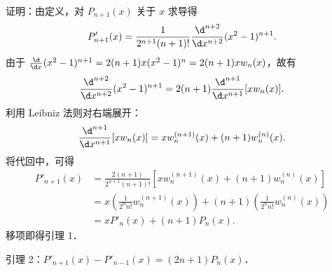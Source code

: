 \begin{myproof}
    证明：由定义，对 $P_{n+1}(x)$ 关于 $x$ 求导得
    \begin{equation}\label{eq:lemma1-step1}
        P'_{n+1}(x) = \frac{1}{2^{n+1}(n+1)!} \frac{\d^{n+2}}{\d x^{n+2}} (x^2 - 1)^{n+1}.
    \end{equation}
    由于 $\frac{\d}{\d x} (x^2 - 1)^{n+1} = 2(n+1)x (x^2 - 1)^n = 2(n+1) x w_n(x)$，故有
    \begin{equation}\label{eq:lemma1-step2}
        \frac{\d^{n+2}}{\d x^{n+2}} (x^2 - 1)^{n+1} = 2(n+1) \frac{\d^{n+1}}{\d x^{n+1}} [ x w_n(x) ].
    \end{equation}
    利用 Leibniz 法则对右端展开：
    \begin{equation}\label{eq:lemma1-step3}
        \frac{\d^{n+1}}{\d x^{n+1}} [ x w_n(x) ] = x w_n^{(n+1)}(x) + (n+1) w_n^{(n)}(x).
    \end{equation}
    将代回中，可得
    \begin{equation}\label{eq:lemma1-step4}
        \begin{aligned}
            P'_{n+1}(x) & = \frac{2(n+1)}{2^{n+1}(n+1)!} \left[ x w_n^{(n+1)}(x) + (n+1) w_n^{(n)}(x) \right]                     \\
                        & = x \left( \frac{1}{2^n n!} w_n^{(n+1)}(x) \right) + (n+1) \left( \frac{1}{2^n n!} w_n^{(n)}(x) \right) \\
                        & = x P'_n(x) + (n+1) P_n(x).
        \end{aligned}
    \end{equation}
    移项即得引理 1．

    引理 2：$P'_{n+1}(x) - P'_{n-1}(x) = (2n+1) P_n(x)$．


\end{myproof}
